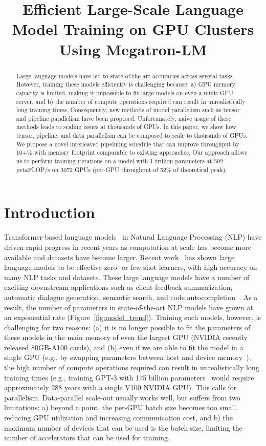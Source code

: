 \title{Efficient Large-Scale Language Model Training on GPU Clusters Using Megatron-LM}

\begin{abstract}
Large language models have led to state-of-the-art accuracies across several tasks. However, training these models efficiently is challenging because: a) GPU memory capacity is limited, making it impossible to fit large models on even a multi-GPU server, and b) the number of compute operations required can result in unrealistically long training times. Consequently, new methods of model parallelism such as tensor and pipeline parallelism have been proposed. Unfortunately, naive usage of these methods leads to scaling issues at thousands of GPUs. In this paper, we show how tensor, pipeline, and data parallelism can be composed to scale to thousands of GPUs. We propose a novel interleaved pipelining schedule that can improve throughput by 10+\% with memory footprint comparable to existing approaches. Our approach allows us to perform training iterations on a model with 1 trillion parameters at 502 petaFLOP/s on 3072 GPUs (per-GPU throughput of 52\% of theoretical peak).
\end{abstract}

\section{Introduction}

Transformer-based language models~\cite{vaswani2017attention,Radford2018GPT,radford2019language,devlin2018bert, roberta,xlnet,T5} in Natural Language Processing (NLP) have driven rapid progress in recent years as computation at scale has become more available and datasets have become larger. Recent work~\cite{gpt3, shoeybi2019megatron} has shown large language models to be effective zero- or few-shot learners, with high accuracy on many NLP tasks and datasets. These large language models have a number of exciting downstream applications such as client feedback summarization, automatic dialogue generation, semantic search, and code autocompletion~\cite{gpt3applications, microsoftcodecompletion, githubcopilot}. As a result, the number of parameters in state-of-the-art NLP models have grown at an exponential rate (Figure~\ref{fig:model_trend}). Training such models, however, is challenging for two reasons: (a) it is no longer possible to fit the parameters of these models in the main memory of even the largest GPU (NVIDIA recently released 80GB-A100 cards), and (b) even if we are able to fit the model in a single GPU (e.g., by swapping parameters between host and device memory~\cite{ren2021zero}), the high number of compute operations required can result in unrealistically long training times (e.g., training GPT-3 with 175 billion parameters~\cite{gpt3} would require approximately 288 years with a single V100 NVIDIA GPU). This calls for parallelism. Data-parallel scale-out usually works well, but suffers from two limitations: a) beyond a point, the per-GPU batch size becomes too small, reducing GPU utilization and increasing communication cost, and b) the maximum number of devices that can be used is the batch size, limiting the number of accelerators that can be used for training.

